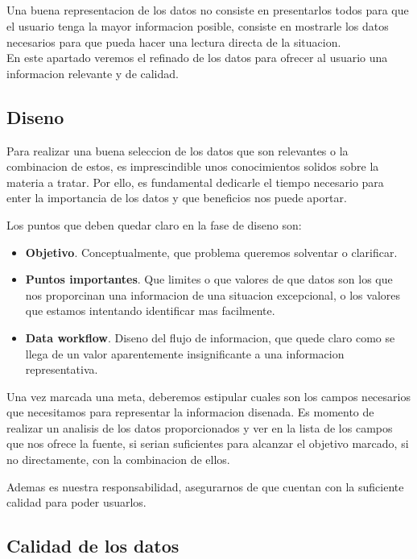 \subsection*{}
Una buena representacion de los datos no consiste en presentarlos todos para que el usuario tenga la mayor informacion posible,
consiste en mostrarle los datos necesarios para que pueda hacer una lectura directa de la situacion.\\

En este apartado veremos el refinado de los datos para ofrecer al usuario una informacion relevante y de calidad.

\subsection{Diseno}
Para realizar una buena seleccion de los datos que son relevantes o la combinacion de estos, es imprescindible unos 
conocimientos solidos sobre la materia a tratar. Por ello, es fundamental dedicarle el tiempo necesario para enter la
importancia de los datos y que beneficios nos puede aportar.

Los puntos que deben quedar claro en la fase de diseno son:

\begin{itemize}
    \item \textbf{Objetivo}. Conceptualmente, que problema queremos solventar o clarificar.
    \item \textbf{Puntos importantes}. Que limites o que valores de que datos son los que nos proporcinan una informacion
    de una situacion excepcional, o los valores que estamos intentando identificar mas facilmente.
    \item \textbf{Data workflow}. Diseno del flujo de informacion, que quede claro como se llega de un valor aparentemente
    insignificante a una informacion representativa.
\end{itemize}

Una vez marcada una meta, deberemos estipular cuales son los campos necesarios que necesitamos para representar la informacion
disenada. 
Es momento de realizar un analisis de los datos proporcionados y ver en la lista de los campos que nos ofrece la fuente, si serian
suficientes para alcanzar el objetivo marcado, si no directamente, con la combinacion de ellos.

Ademas es nuestra responsabilidad, asegurarnos de que cuentan con la suficiente calidad para poder usuarlos.

\subsection{Calidad de los datos}


